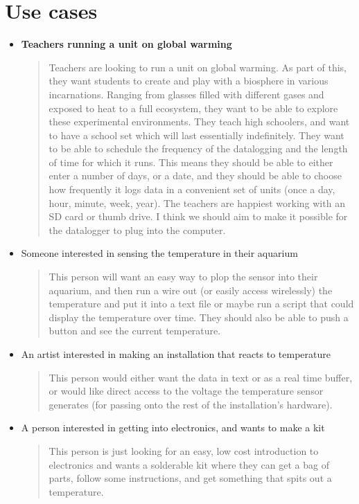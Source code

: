 \documentclass[11pt]{article}
\begin{document}
\section{Use cases}
\begin{itemize}
\item \textbf{Teachers running a unit on global warming}
  \begin{quote}
    Teachers are looking to run a unit on global warming.  As part of this, they want students to create and play with a biosphere in various incarnations.  Ranging from glasses filled with different gases and exposed to heat to a full ecosystem, they want to be able to explore these experimental environments.  They teach high schoolers, and want to have a school set which will last essentially indefinitely.  They want to be able to schedule the frequency of the datalogging and the length of time for which it runs.  This means they should be able to either enter a number of days, or a date, and they should be able to choose how frequently it logs data in a convenient set of units (once a day, hour, minute, week, year).  The teachers are happiest working with an SD card or thumb drive.  I think we should aim to make it possible for the datalogger to plug into the computer.
  \end{quote}
\item Someone interested in sensing the temperature in their aquarium
  \begin{quote}
    This person will want an easy way to plop the sensor into their aquarium, and then run a wire out (or easily access wirelessly) the temperature and put it into a text file or maybe run a script that could display the temperature over time.  They should also be able to push a button and see the current temperature.  \end{quote}

\item An artist interested in making an installation that reacts to temperature
  \begin{quote}
    This person would either want the data in text or as a real time buffer, or would like direct access to the voltage the temperature sensor generates (for passing onto the rest of the installation's hardware).
  \end{quote}

\item A person interested in getting into electronics, and wants to make a kit
  \begin{quote}
    This person is just looking for an easy, low cost introduction to electronics and wants a solderable kit where they can get a bag of parts, follow some instructions, and get something that spits out a temperature.
  \end{quote}
\end{itemize}
\end{document}
